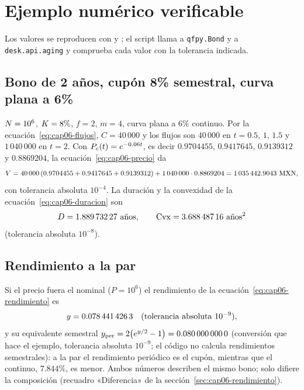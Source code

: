 \section{Ejemplo numérico verificable}\label{sec:cap06-ejemplo}

Los valores se reproducen con  y
; el script llama a \texttt{qfpy.Bond} y a
\texttt{desk.api.aging} y comprueba cada valor con la tolerancia indicada.

\subsection{Bono de 2 años, cupón 8\% semestral, curva plana a 6\%}

$\Nom=10^{6}$, $\K=8\%$, $f=2$, $m=4$, curva plana a $6\%$ continuo. Por la
ecuación~\eqref{eq:cap06-flujos}, $C=40\,000$ y los flujos son $40\,000$ en $t=0.5,\,1,\,1.5$ y $1\,040\,000$ en
$t=2$. Con $\DF{c}{t}=e^{-0.06t}$, es decir $0.9704455$, $0.9417645$, $0.9139312$ y $0.8869204$, la
ecuación~\eqref{eq:cap06-precio} da
\[
  V = 40\,000\,(0.9704455+0.9417645+0.9139312)+1\,040\,000\cdot0.8869204
  = \verif{cap06-precio-sucio}{1035442.9043}\ \MXN,
\]
con tolerancia absoluta $10^{-4}$. La duración y la convexidad de la ecuación~\eqref{eq:cap06-duracion} son
\[
  D=\verif{cap06-duracion}{1.88973227}\ \text{años},\qquad
  \mathrm{Cvx}=\verif{cap06-convexidad}{3.68848716}\ \text{años}^2
\]
(tolerancia absoluta $10^{-8}$).

\subsection{Rendimiento a la par}

Si el precio fuera el nominal ($P=10^{6}$) el rendimiento de la ecuación~\eqref{eq:cap06-rendimiento} es
\[
  y=\verif{cap06-rendimiento-par}{0.0784414263}\quad(\text{tolerancia absoluta }10^{-9}),
\]
y su equivalente semestral $y_{\mathrm{per}}=2\bigl(e^{y/2}-1\bigr)=\verif{cap06-rendimiento-semestral}{0.0800000000}$
(conversión que hace el ejemplo, tolerancia absoluta $10^{-9}$; el código no calcula rendimientos semestrales): a la par el rendimiento periódico es el cupón, mientras que el continuo,
$7.844\%$, es menor. Ambos números describen el mismo bono; solo difiere la composición (recuadro
«Diferencia» de la sección~\ref{sec:cap06-rendimiento}).

